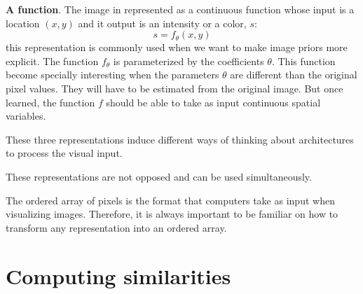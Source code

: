 {\bf A function}. The image in represented as a continuous function whose input is
a location $(x, y)$ and it output is an intensity or a color, $s$:
\begin{equation}
   s = f_{\theta}(x,y)
\end{equation}
this representation is commonly used when we want to make image priors more explicit. The function $f_{\theta}$ is parameterized by the coefficients $\theta$. This function become specially interesting when the parameters $\theta$ are different than the original pixel values. They will have to be estimated from the original image. But once learned, the function $f$ should be able to take as input continuous spatial variables.

These three representations induce different ways of thinking about architectures to process the visual input. 

These representations are not opposed and can be used simultaneously.

The ordered array of pixels is the format that computers take as input when visualizing images. Therefore, it is always important to be familiar on how to transform any representation into an ordered array.


\section{Computing similarities}







